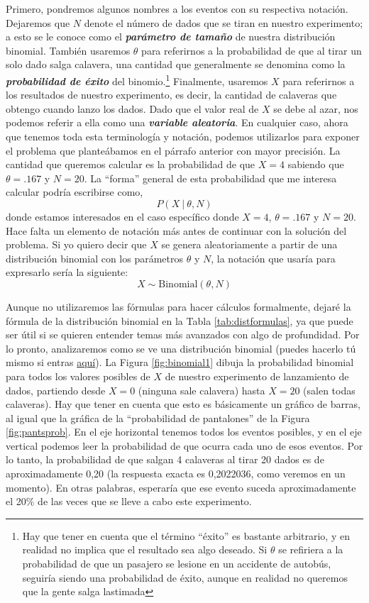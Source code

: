 \documentclass[spanish,]{book}
\let\rmarkdownfootnote\footnote%
\def\footnote{\protect\rmarkdownfootnote}
\begin{document}
Primero, pondremos algunos nombres a los eventos con su respectiva
notación. Dejaremos que \(N\) denote el número de dados que se tiran en
nuestro experimento; a esto se le conoce como el \textbf{\emph{parámetro
de tamaño}} de nuestra distribución binomial. También usaremos
\(\theta\) para referirnos a la probabilidad de que al tirar un solo
dado salga calavera, una cantidad que generalmente se denomina como la
\textbf{\emph{probabilidad de éxito}} del binomio.\footnote{Hay que
  tener en cuenta que el término ``éxito'' es bastante arbitrario, y en
  realidad no implica que el resultado sea algo deseado. Si \(\theta\)
  se refiriera a la probabilidad de que un pasajero se lesione en un
  accidente de autobús, seguiría siendo una probabilidad de éxito,
  aunque en realidad no queremos que la gente salga lastimada}
Finalmente, usaremos \(X\) para referirnos a los resultados de nuestro
experimento, es decir, la cantidad de calaveras que obtengo cuando lanzo
los dados. Dado que el valor real de \(X\) se debe al azar, nos podemos
referir a ella como una \textbf{\emph{variable aleatoria}}. En cualquier
caso, ahora que tenemos toda esta terminología y notación, podemos
utilizarlos para exponer el problema que planteábamos en el párrafo
anterior con mayor precisión. La cantidad que queremos calcular es la
probabilidad de que \(X = 4\) sabiendo que \(\theta = .167\) y \(N=20\).
La ``forma'' general de esta probabilidad que me interesa calcular
podría escribirse como, \[
  P(X \ | \ \theta, N)
\] donde estamos interesados en el caso específico donde \(X=4\),
\(\theta = .167\) y \(N=20\). Hace falta un elemento de notación más
antes de continuar con la solución del problema. Si yo quiero decir que
\(X\) se genera aleatoriamente a partir de una distribución binomial con
los parámetros \(\theta\) y \(N\), la notación que usaría para
expresarlo sería la siguiente: \[
  X \sim \mbox{Binomial}(\theta, N)
\]

Aunque no utilizaremos las fórmulas para hacer cálculos formalmente,
dejaré la fórmula de la distribución binomial en la Tabla
\ref{tab:distformulas}, ya que puede ser útil si se quieren entender
temas más avanzados con algo de profundidad. Por lo pronto, analizaremos
como se ve una distribución binomial (puedes hacerlo tú mismo si entras
\href{https://leudave.shinyapps.io/distribuciones/}{aquí}). La Figura
\ref{fig:binomial1} dibuja la probabilidad binomial para todos los
valores posibles de \(X\) de nuestro experimento de lanzamiento de
dados, partiendo desde \(X=0\) (ninguna sale calavera) hasta \(X=20\)
(salen todas calaveras). Hay que tener en cuenta que esto es básicamente
un gráfico de barras, al igual que la gráfica de la ``probabilidad de
pantalones'' de la Figura \ref{fig:pantsprob}. En el eje horizontal
tenemos todos los eventos posibles, y en el eje vertical podemos leer la
probabilidad de que ocurra cada uno de esos eventos. Por lo tanto, la
probabilidad de que salgan 4 calaveras al tirar 20 dados es de
aproximadamente 0,20 (la respuesta exacta es 0,2022036, como veremos en
un momento). En otras palabras, esperaría que ese evento suceda
aproximadamente el 20\% de las veces que se lleve a cabo este
experimento.
\end{document}
